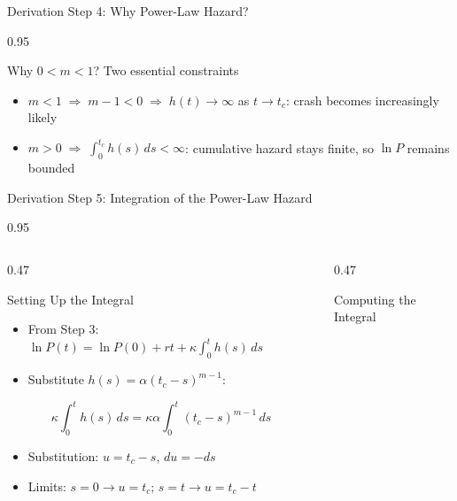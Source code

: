 \documentclass[9pt, aspectratio=169, t]{beamer}
\begin{document}
\begin{frame}{Derivation Step 4: Why Power-Law Hazard?}
\begin{cminipage}{0.95\textwidth}
{    \begin{exampleblock}{Why $0 < m < 1$? Two essential constraints}
        \begin{itemize}\setlength{\itemsep}{0pt}
            \item $m < 1 \;\Rightarrow\; m{-}1 < 0 \;\Rightarrow\; h(t) \to \infty$ as $t \to t_c$: crash becomes increasingly likely
            \item $m > 0 \;\Rightarrow\; \int_0^{t_c}\! h(s)\,ds < \infty$: cumulative hazard stays finite, so $\ln P$ remains bounded
        \end{itemize}
    \end{exampleblock}
    }
    \end{cminipage}
\end{frame}

\begin{frame}{Derivation Step 5: Integration of the Power-Law Hazard}
    \begin{cminipage}{0.95\textwidth}
    {\footnotesize
    \begin{columns}[T]
        \begin{column}{0.47\textwidth}
            \begin{block}{Setting Up the Integral}
                \begin{itemize}\setlength{\itemsep}{0pt}
                    \item From Step 3: $\ln P(t) = \ln P(0) + rt + \kappa\!\int_0^t\! h(s)\,ds$
                    \item Substitute $h(s) = \alpha(t_c - s)^{m-1}$:
                \end{itemize}
                \vspace{-2mm}
                $$\kappa\!\int_0^t\! h(s)\,ds = \kappa\alpha\!\int_0^t\! (t_c - s)^{m-1}\,ds$$
                \vspace{-4mm}
                \begin{itemize}\setlength{\itemsep}{0pt}
                    \item Substitution: $u = t_c - s$, $du = -ds$
                    \item Limits: $s{=}0 \!\to\! u{=}t_c$;\; $s{=}t \!\to\! u{=}t_c{-}t$
                \end{itemize}
            \end{block}
        \end{column}
        \begin{column}{0.47\textwidth}
            \begin{alertblock}{Computing the Integral}

\end{alertblock}
\end{column}
\end{columns}}
\end{cminipage}
\end{frame}
\end{document}
